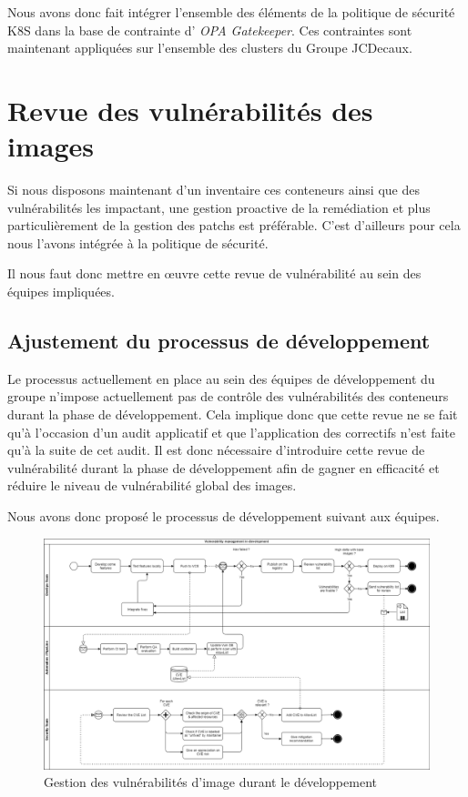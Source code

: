 Nous avons donc fait intégrer l'ensemble des éléments de la politique de sécurité \ac{K8S} dans la base de contrainte d'
\emph{OPA Gatekeeper}. Ces contraintes sont maintenant appliquées sur l'ensemble des clusters du Groupe JCDecaux.

\newpage

\section{Revue des vulnérabilités des images} \label{section:revue-vul-img}
Si nous disposons maintenant d'un inventaire ces conteneurs ainsi que des vulnérabilités les impactant, une gestion 
proactive de la remédiation et plus particulièrement de la gestion des patchs est préférable. C'est d'ailleurs pour cela 
nous l'avons intégrée à la politique de sécurité.

Il nous faut donc mettre en œuvre cette revue de vulnérabilité au sein des équipes impliquées.

\subsection{Ajustement du processus de développement}

Le processus  actuellement en place au sein des équipes de développement du groupe n'impose actuellement pas de contrôle
des vulnérabilités des conteneurs durant la phase de développement. Cela implique donc que cette revue ne se fait qu'à 
l'occasion d'un audit applicatif et que l'application des correctifs n'est faite qu'à la suite de cet audit. 
\newline Il est donc nécessaire d'introduire cette revue de vulnérabilité durant la phase de développement afin de gagner
en efficacité et réduire le niveau de vulnérabilité global des images.

Nous avons donc proposé le processus de développement suivant aux équipes.
\begin{figure}[h]
    \centering
    \includegraphics[width=\linewidth]{resources/img/container_image_vuln_mgnt_dev.png}
    \caption{Gestion des vulnérabilités d'image durant le développement}
\end{figure}

